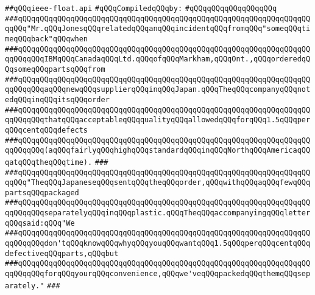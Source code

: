 \label{src/lib/std/src/ieee-float.api}
\verb|##qQQqieee-float.api|\newline
\newline
\verb|#qQQqCompiledqQQqby:|\newline
\verb|#qQQqqQQqqQQqqQQqqQQq|\newline
\newline
\newline
\newline
\verb|###qQQqqQQqqQQqqQQqqQQqqQQqqQQqqQQqqQQqqQQqqQQqqQQqqQQqqQQqqQQqqQQqqQQqqQQq"Mr.qQQqJonesqQQqrelatedqQQqanqQQqincidentqQQqfromqQQq"someqQQqtimeqQQqback"qQQqwhen|\newline
\verb|###qQQqqQQqqQQqqQQqqQQqqQQqqQQqqQQqqQQqqQQqqQQqqQQqqQQqqQQqqQQqqQQqqQQqqQQqqQQqIBMqQQqCanadaqQQqLtd.qQQqofqQQqMarkham,qQQqOnt.,qQQqorderedqQQqsomeqQQqpartsqQQqfrom|\newline
\verb|###qQQqqQQqqQQqqQQqqQQqqQQqqQQqqQQqqQQqqQQqqQQqqQQqqQQqqQQqqQQqqQQqqQQqqQQqqQQqaqQQqnewqQQqsupplierqQQqinqQQqJapan.qQQqTheqQQqcompanyqQQqnotedqQQqinqQQqitsqQQqorder|\newline
\verb|###qQQqqQQqqQQqqQQqqQQqqQQqqQQqqQQqqQQqqQQqqQQqqQQqqQQqqQQqqQQqqQQqqQQqqQQqqQQqthatqQQqacceptableqQQqqualityqQQqallowedqQQqforqQQq1.5qQQqperqQQqcentqQQqdefects|\newline
\verb|###qQQqqQQqqQQqqQQqqQQqqQQqqQQqqQQqqQQqqQQqqQQqqQQqqQQqqQQqqQQqqQQqqQQqqQQqqQQq(aqQQqfairlyqQQqhighqQQqstandardqQQqinqQQqNorthqQQqAmericaqQQqatqQQqtheqQQqtime).|\newline
\verb|###|\newline
\verb|###qQQqqQQqqQQqqQQqqQQqqQQqqQQqqQQqqQQqqQQqqQQqqQQqqQQqqQQqqQQqqQQqqQQqqQQq"TheqQQqJapaneseqQQqsentqQQqtheqQQqorder,qQQqwithqQQqaqQQqfewqQQqpartsqQQqpackaged|\newline
\verb|###qQQqqQQqqQQqqQQqqQQqqQQqqQQqqQQqqQQqqQQqqQQqqQQqqQQqqQQqqQQqqQQqqQQqqQQqqQQqseparatelyqQQqinqQQqplastic.qQQqTheqQQqaccompanyingqQQqletterqQQqsaid:qQQq"We|\newline
\verb|###qQQqqQQqqQQqqQQqqQQqqQQqqQQqqQQqqQQqqQQqqQQqqQQqqQQqqQQqqQQqqQQqqQQqqQQqqQQqdon'tqQQqknowqQQqwhyqQQqyouqQQqwantqQQq1.5qQQqperqQQqcentqQQqdefectiveqQQqparts,qQQqbut|\newline
\verb|###qQQqqQQqqQQqqQQqqQQqqQQqqQQqqQQqqQQqqQQqqQQqqQQqqQQqqQQqqQQqqQQqqQQqqQQqqQQqforqQQqyourqQQqconvenience,qQQqwe'veqQQqpackedqQQqthemqQQqseparately."|\newline
\verb|###|\newline

